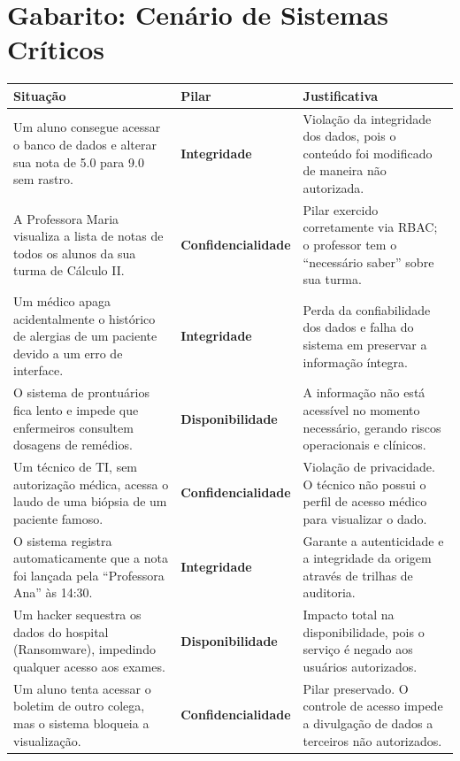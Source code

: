 \newpage

\section*{Gabarito: Cenário de Sistemas Críticos}

\begin{table}[h!]
    \centering
    \renewcommand{\arraystretch}{1.5}
    \begin{tabular}{|p{5.5cm}|p{3cm}|p{6.5cm}|}
        \hline
        \textbf{Situação}                                                                                    & \textbf{Pilar}             & \textbf{Justificativa}                                                                           \\ \hline
        Um aluno consegue acessar o banco de dados e alterar sua nota de 5.0 para 9.0 sem rastro.            & \textbf{Integridade}       & Violação da integridade dos dados, pois o conteúdo foi modificado de maneira não autorizada.     \\ \hline
        A Professora Maria visualiza a lista de notas de todos os alunos da sua turma de Cálculo II.         & \textbf{Confidencialidade} & Pilar exercido corretamente via RBAC; o professor tem o ``necessário saber'' sobre sua turma.    \\ \hline
        Um médico apaga acidentalmente o histórico de alergias de um paciente devido a um erro de interface. & \textbf{Integridade}       & Perda da confiabilidade dos dados e falha do sistema em preservar a informação íntegra.          \\ \hline
        O sistema de prontuários fica lento e impede que enfermeiros consultem dosagens de remédios.         & \textbf{Disponibilidade}   & A informação não está acessível no momento necessário, gerando riscos operacionais e clínicos.   \\ \hline
        Um técnico de TI, sem autorização médica, acessa o laudo de uma biópsia de um paciente famoso.       & \textbf{Confidencialidade} & Violação de privacidade. O técnico não possui o perfil de acesso médico para visualizar o dado.  \\ \hline
        O sistema registra automaticamente que a nota foi lançada pela ``Professora Ana'' às 14:30.          & \textbf{Integridade}       & Garante a autenticidade e a integridade da origem através de trilhas de auditoria.               \\ \hline
        Um hacker sequestra os dados do hospital (Ransomware), impedindo qualquer acesso aos exames.         & \textbf{Disponibilidade}   & Impacto total na disponibilidade, pois o serviço é negado aos usuários autorizados.              \\ \hline
        Um aluno tenta acessar o boletim de outro colega, mas o sistema bloqueia a visualização.             & \textbf{Confidencialidade} & Pilar preservado. O controle de acesso impede a divulgação de dados a terceiros não autorizados. \\ \hline
    \end{tabular}
\end{table}


